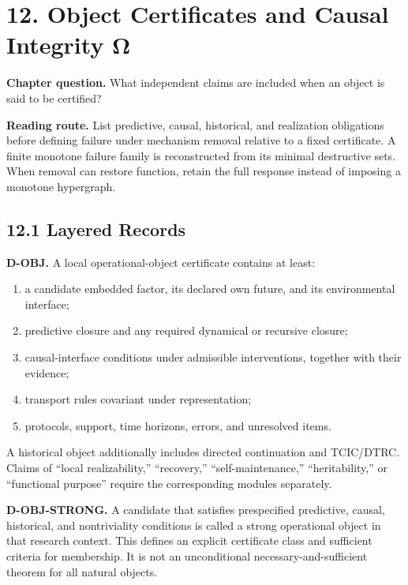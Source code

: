 \documentclass[
  english,
  11pt,
  oneside]{book}
\providecommand{\tightlist}{%
  \setlength{\itemsep}{0pt}\setlength{\parskip}{0pt}}
\begin{document}
\chapter{12. Object Certificates and Causal Integrity Ω}\label{ch-12}

\textbf{Chapter question.} What independent claims are included when an object is said to be certified?

\textbf{Reading route.} List predictive, causal, historical, and realization obligations before defining failure under mechanism removal relative to a fixed certificate. A finite monotone failure family is reconstructed from its minimal destructive sets. When removal can restore function, retain the full response instead of imposing a monotone hypergraph.

\section{12.1 Layered Records}\label{layered-records}

\textbf{D-OBJ.} A local operational-object certificate contains at least:

\begin{enumerate}
\def\labelenumi{\arabic{enumi}.}
\tightlist
\item
  a candidate embedded factor, its declared own future, and its environmental interface;
\item
  predictive closure and any required dynamical or recursive closure;
\item
  causal-interface conditions under admissible interventions, together with their evidence;
\item
  transport rules covariant under representation;
\item
  protocols, support, time horizons, errors, and unresolved items.
\end{enumerate}

A historical object additionally includes directed continuation and TCIC/DTRC. Claims of ``local realizability,'' ``recovery,'' ``self-maintenance,'' ``heritability,'' or ``functional purpose'' require the corresponding modules separately.

\textbf{D-OBJ-STRONG.} A candidate that satisfies prespecified predictive, causal, historical, and nontriviality conditions is called a strong operational object in that research context. This defines an explicit certificate class and sufficient criteria for membership. It is not an unconditional necessary-and-sufficient theorem for all natural objects.
\end{document}
